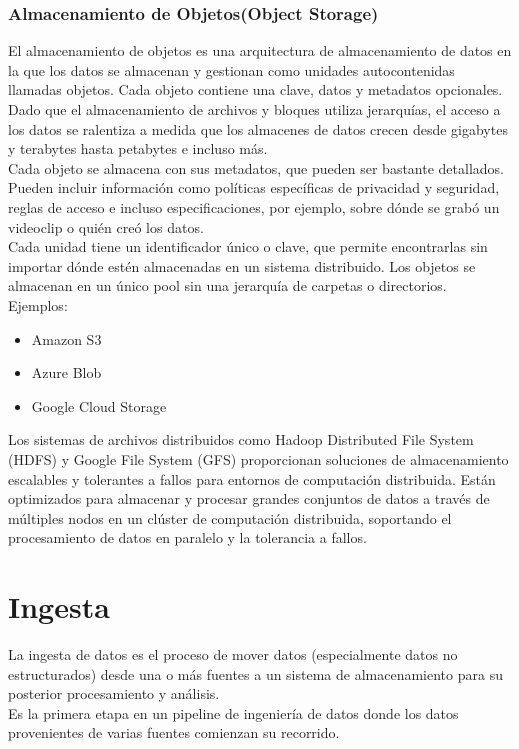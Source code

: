 \documentclass[12pt]{book}
\begin{document}
\subsubsection{Almacenamiento de Objetos(Object Storage)}
El almacenamiento de objetos es una arquitectura de almacenamiento de datos en la que los datos se almacenan y gestionan como unidades autocontenidas llamadas objetos. Cada objeto contiene una clave, datos y metadatos opcionales. Dado que el almacenamiento de archivos y bloques utiliza jerarquías, el acceso a los datos se ralentiza a medida que los almacenes de datos crecen desde gigabytes y terabytes hasta petabytes e incluso más.\\
Cada objeto se almacena con sus metadatos, que pueden ser bastante detallados. Pueden incluir información como políticas específicas de privacidad y seguridad, reglas de acceso e incluso especificaciones, por ejemplo, sobre dónde se grabó un videoclip o quién creó los datos.\\    
Cada unidad tiene un identificador único o clave, que permite encontrarlas sin importar dónde estén almacenadas en un sistema distribuido. Los objetos se almacenan en un único pool sin una jerarquía de carpetas o directorios.\\

Ejemplos:
\begin{itemize}
    \item Amazon S3
    \item Azure Blob
    \item Google Cloud Storage
\end{itemize}

Los sistemas de archivos distribuidos como Hadoop Distributed File System (HDFS) y Google File System (GFS) proporcionan soluciones de almacenamiento escalables y tolerantes a fallos para entornos de computación distribuida. Están optimizados para almacenar y procesar grandes conjuntos de datos a través de múltiples nodos en un clúster de computación distribuida, soportando el procesamiento de datos en paralelo y la tolerancia a fallos.

\section{Ingesta}
La ingesta de datos es el proceso de mover datos (especialmente datos no estructurados) desde una o más fuentes a un sistema de almacenamiento para su posterior procesamiento y análisis.\\
Es la primera etapa en un pipeline de ingeniería de datos donde los datos provenientes de varias fuentes comienzan su recorrido.
\end{document}
